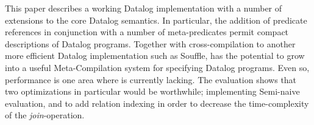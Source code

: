 This paper describes a working Datalog implementation with a number of extensions to the core Datalog semantics. In particular, the addition of predicate references in conjunction with a number of meta-predicates permit compact descriptions of Datalog programs. Together with cross-compilation to another more efficient Datalog implementation such as Souffle, \datalogM has the potential to grow into a useful Meta-Compilation system for specifying Datalog programs. Even so, performance is one area where \datalogM is currently lacking. The evaluation shows that two optimizations in particular would be worthwhile; implementing Semi-naive evaluation, and to add relation indexing in order to decrease the time-complexity of the \textit{join}-operation.
